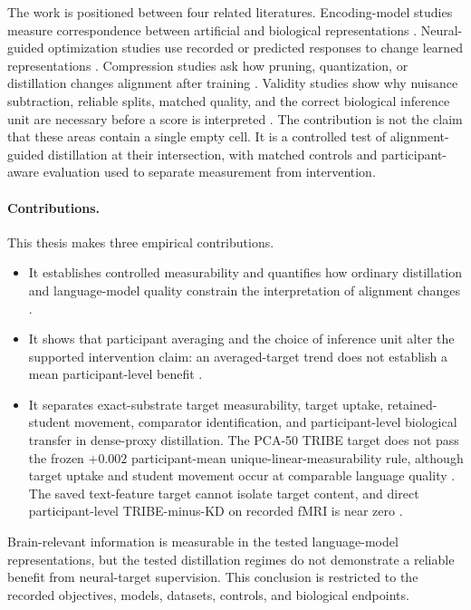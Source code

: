 The work is positioned between four related literatures.
Encoding-model studies measure correspondence between artificial and biological representations \autocite{tuckute2024,oota2023,merlin2024}.
Neural-guided optimization studies use recorded or predicted responses to change learned representations \autocite{moussa2025,merlinData2026,vaidya2026}.
Compression studies ask how pruning, quantization, or distillation changes alignment after training \autocite{oota2026}.
Validity studies show why nuisance subtraction, reliable splits, matched quality, and the correct biological inference unit are necessary before a score is interpreted \autocite{oota2024,hadidi2026,jia2026}.
The contribution is not the claim that these areas contain a single empty cell.
It is a controlled test of alignment-guided distillation at their intersection, with matched controls and participant-aware evaluation used to separate measurement from intervention.

\paragraph{Contributions.}\leavevmode\par\smallskip
This thesis makes three empirical contributions.
\begin{itemize}[noitemsep,topsep=2pt]
  \item It establishes controlled measurability and quantifies how ordinary distillation and language-model quality constrain the interpretation of alignment changes .
  \item It shows that participant averaging and the choice of inference unit alter the supported intervention claim: an averaged-target trend does not establish a mean participant-level benefit .
  \item It separates exact-substrate target measurability, target uptake, retained-student movement, comparator identification, and participant-level biological transfer in dense-proxy distillation.
  The PCA-50 TRIBE target does not pass the frozen $+0.002$ participant-mean unique-linear-measurability rule, although target uptake and student movement occur at comparable language quality .
  The saved text-feature target cannot isolate target content, and direct participant-level TRIBE-minus-KD on recorded fMRI is near zero .
\end{itemize}

Brain-relevant information is measurable in the tested language-model representations, but the tested distillation regimes do not demonstrate a reliable benefit from neural-target supervision.
This conclusion is restricted to the recorded objectives, models, datasets, controls, and biological endpoints.
